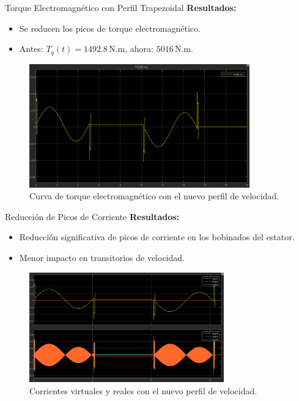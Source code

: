 \documentclass[12pt]{beamer}
\begin{document}
\begin{frame}{Torque Electromagnético con Perfil Trapezoidal}
    \textbf{Resultados:}
    \begin{itemize}
        \item Se reducen los picos de torque electromagnético.
        \item Antes: \(T_q(t) = 1492.8\,\text{N.m}\), ahora: \(5016\,\text{N.m}\).
    \end{itemize}
    \begin{figure}
        \centering
        \includegraphics[width=0.85\textwidth]{Imagenes/Torque_electromagnetico_velocidad_trapezoidal.png}
        \caption{Curva de torque electromagnético con el nuevo perfil de velocidad.}
        \label{fig:Torque_electromagnetico_velocidad_trapezoidal}
    \end{figure}
\end{frame}

\begin{frame}{Reducción de Picos de Corriente}
    \textbf{Resultados:}
    \begin{itemize}
        \item Reducción significativa de picos de corriente en los bobinados del estator.
        \item Menor impacto en transitorios de velocidad.
    \end{itemize}
    \begin{figure}
        \centering
        \includegraphics[width=0.75\textwidth]{Imagenes/Corrientes_velocidad_trapezoidal.png}
        \caption{Corrientes virtuales y reales con el nuevo perfil de velocidad.}
        \label{fig:Corrientes_velocidad_trapezoidal}
    \end{figure}
\end{frame}
\end{document}
